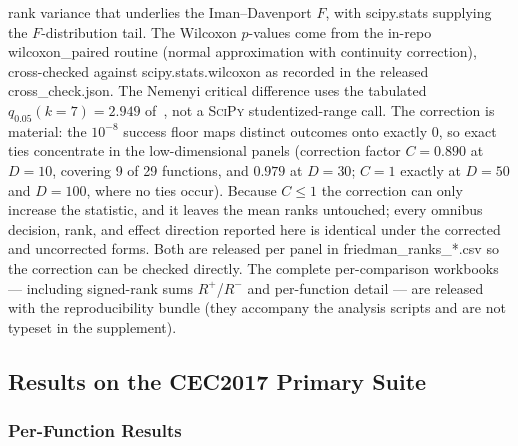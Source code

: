 rank variance that underlies the Iman--Davenport $F$, with scipy.stats
supplying the $F$-distribution tail. The Wilcoxon $p$-values come from the
in-repo wilcoxon\_paired routine (normal approximation with continuity
correction), cross-checked against scipy.stats.wilcoxon as recorded
in the released cross\_check.json. The Nemenyi critical difference uses the tabulated
$q_{0.05}(k = 7) = 2.949$ of~\cite{demsar2006statistical}, not a \textsc{SciPy}
studentized-range call. The correction
is material: the $10^{-8}$ success floor maps distinct outcomes onto
exactly $0$, so exact ties concentrate in the low-dimensional panels
(correction factor $C = 0.890$ at $D = 10$, covering 9 of 29 functions,
and $0.979$ at $D = 30$; $C = 1$ exactly at $D = 50$ and $D = 100$, where
no ties occur). Because $C \le 1$ the correction can only increase the
statistic, and it leaves the mean ranks untouched; every omnibus decision,
rank, and effect direction reported here is identical under the corrected
and uncorrected forms. Both are released per panel in
friedman\_ranks\_*.csv so the correction can be checked directly.
The complete
per-comparison workbooks --- including signed-rank sums $R^{+}$/$R^{-}$
and per-function detail --- are released with the reproducibility bundle
(they accompany the analysis scripts and are not typeset in the supplement).

\subsection{Results on the CEC2017 Primary Suite}\label{sec:exp:cec2017}

\subsubsection{Per-Function Results}\label{sec:exp:cec2017:desc}

